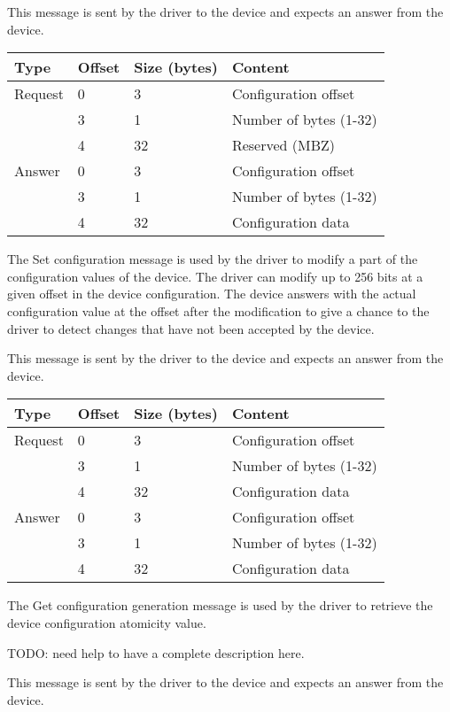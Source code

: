 This message is sent by the driver to the device and expects an answer from the
device.

\begin{tabular}{|l|l|l|l|}
\hline
Type & Offset & Size (bytes) & Content \\
\hline \hline
Request & 0 & 3 & Configuration offset \\
& 3 & 1 & Number of bytes (1-32) \\
& 4 & 32 & Reserved (MBZ) \\
\hline
Answer & 0 & 3 & Configuration offset \\
& 3 & 1 & Number of bytes (1-32) \\
& 4 & 32 & Configuration data \\
\hline
\end{tabular}


The Set configuration message is used by the driver to modify a part of the
configuration values of the device. The driver can modify up to 256 bits at a
given offset in the device configuration. The device answers with the actual
configuration value at the offset after the modification to give a chance to the
driver to detect changes that have not been accepted by the device.

This message is sent by the driver to the device and expects an answer from the
device.

\begin{tabular}{|l|l|l|l|}
\hline
Type & Offset & Size (bytes) & Content \\
\hline \hline
Request & 0 & 3 & Configuration offset \\
& 3 & 1 & Number of bytes (1-32) \\
& 4 & 32 & Configuration data \\
\hline
Answer & 0 & 3 & Configuration offset \\
& 3 & 1 & Number of bytes (1-32) \\
& 4 & 32 & Configuration data \\
\hline
\end{tabular}


The Get configuration generation message is used by the driver to retrieve the
device configuration atomicity value.

TODO: need help to have a complete description here.

This message is sent by the driver to the device and expects an answer from the
device.

